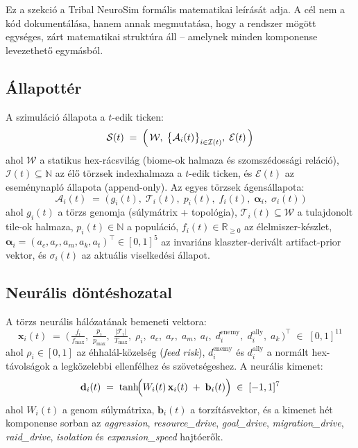 Ez a szekció a Tribal NeuroSim formális matematikai leírását adja. A cél nem a kód dokumentálása,
hanem annak megmutatása, hogy a rendszer mögött egységes, zárt matematikai struktúra áll --
amelynek minden komponense levezethető egymásból.

\subsection*{Állapottér}

A szimuláció állapota a $t$-edik ticken:
\begin{equation}
\mathcal{S}(t) \;=\; \Bigl(\, \mathcal{W},\;\bigl\{\mathcal{A}_i(t)\bigr\}_{i \in \mathcal{I}(t)},\;\mathcal{E}(t) \,\Bigr)
\end{equation}
ahol $\mathcal{W}$ a statikus hex-rácsvilág (biome-ok halmaza és szomszédossági reláció),
$\mathcal{I}(t) \subseteq \mathbb{N}$ az élő törzsek indexhalmaza a $t$-edik ticken,
és $\mathcal{E}(t)$ az eseménynapló állapota (append-only). Az egyes törzsek ágensállapota:
\begin{equation}
\mathcal{A}_i(t) \;=\; \bigl(\, g_i(t),\;\mathcal{T}_i(t),\; p_i(t),\; f_i(t),\;\boldsymbol{\alpha}_i,\;\sigma_i(t) \,\bigr)
\end{equation}
ahol $g_i(t)$ a törzs genomja (súlymátrix + topológia), $\mathcal{T}_i(t) \subseteq \mathcal{W}$
a tulajdonolt tile-ok halmaza, $p_i(t) \in \mathbb{N}$ a populáció, $f_i(t) \in \mathbb{R}_{\geq 0}$
az élelmiszer-készlet, $\boldsymbol{\alpha}_i = (a_c, a_r, a_m, a_k, a_t)^{\!\top} \in [0,1]^5$
az invariáns klaszter-derivált artifact-prior vektor, és $\sigma_i(t)$ az aktuális viselkedési
állapot.

\subsection*{Neurális döntéshozatal}

A törzs neurális hálózatának bemeneti vektora:
\begin{equation}
\mathbf{x}_i(t) \;=\; \bigl(\,
  \tfrac{f_i}{f_{\max}},\;
  \tfrac{p_i}{p_{\max}},\;
  \tfrac{|\mathcal{T}_i|}{T_{\max}},\;
  \rho_i,\;
  a_c,\; a_r,\; a_m,\; a_t,\;
  d^{\text{enemy}}_i,\; d^{\text{ally}}_i,\;
  a_k
\,\bigr)^{\!\top} \;\in\; [0,1]^{11}
\end{equation}
ahol $\rho_i \in [0,1]$ az éhhalál-közelség (\textit{feed risk}), $d^{\text{enemy}}_i$ és
$d^{\text{ally}}_i$ a normált hex-távolságok a legközelebbi ellenfélhez és szövetségeshez.
A neurális kimenet:
\begin{equation}
\mathbf{d}_i(t) \;=\; \tanh\!\Bigl( W_i(t)\,\mathbf{x}_i(t) \;+\; \mathbf{b}_i(t) \Bigr)
\;\in\; [-1,1]^7
\end{equation}
ahol $W_i(t)$ a genom súlymátrixa, $\mathbf{b}_i(t)$ a torzításvektor, és a kimenet hét
komponense sorban az \textit{aggression}, \textit{resource\_drive}, \textit{goal\_drive},
\textit{migration\_drive}, \textit{raid\_drive}, \textit{isolation} és \textit{expansion\_speed}
hajtóerők.

